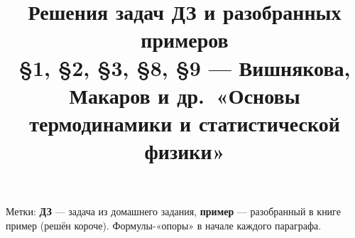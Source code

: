\documentclass[10pt]{article}
\title{Решения задач ДЗ и разобранных примеров\\[2pt]
\large§1, §2, §3, §8, §9 — Вишнякова, Макаров и др.\ «Основы термодинамики и статистической физики»}
\date{}
\begin{document}
\maketitle
\vspace{-8mm}
{\small Метки: \textcolor{dzcol}{\textbf{ДЗ}} — задача из домашнего задания,
\textcolor{excol}{\textbf{пример}} — разобранный в книге пример (решён короче).
Формулы-«опоры» в начале каждого параграфа.}
\tableofcontents






\end{document}
